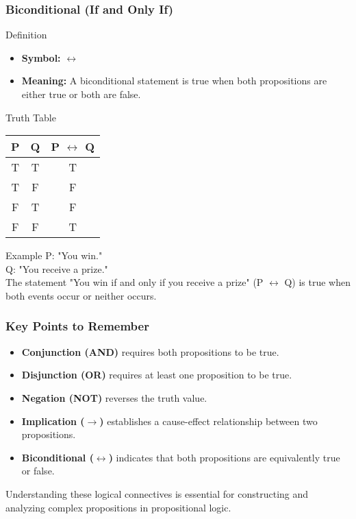 \documentclass[aspectratio=169]{beamer}
\begin{document}
\begin{frame}[fragile]
    \frametitle{Biconditional (If and Only If)}
    \begin{block}{Definition}
        \begin{itemize}
            \item \textbf{Symbol:} $\leftrightarrow$
            \item \textbf{Meaning:} A biconditional statement is true when both propositions are either true or both are false.
        \end{itemize}
    \end{block}
    \begin{block}{Truth Table}
        \begin{center}
            \begin{tabular}{|c|c|c|}
                \hline
                P & Q & P $\leftrightarrow$ Q \\
                \hline
                T & T & T \\
                T & F & F \\
                F & T & F \\
                F & F & T \\
                \hline
            \end{tabular}
        \end{center}
    \end{block}
    \begin{block}{Example}
        P: "You win." \\
        Q: "You receive a prize." \\
        The statement "You win if and only if you receive a prize" (P $\leftrightarrow$ Q) is true when both events occur or neither occurs.
    \end{block}
\end{frame}

\begin{frame}[fragile]
    \frametitle{Key Points to Remember}
    \begin{itemize}
        \item \textbf{Conjunction (AND)} requires both propositions to be true.
        \item \textbf{Disjunction (OR)} requires at least one proposition to be true.
        \item \textbf{Negation (NOT)} reverses the truth value.
        \item \textbf{Implication ($\rightarrow$)} establishes a cause-effect relationship between two propositions.
        \item \textbf{Biconditional ($\leftrightarrow$)} indicates that both propositions are equivalently true or false.
    \end{itemize}
    Understanding these logical connectives is essential for constructing and analyzing complex propositions in propositional logic.
\end{frame}
\end{document}
